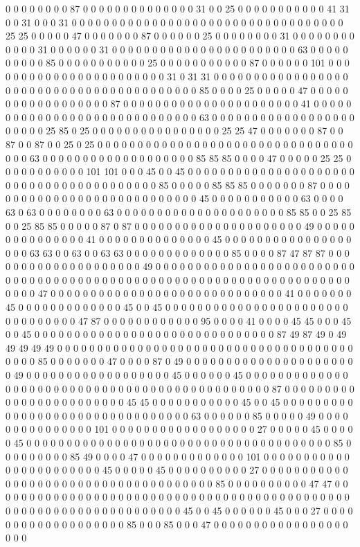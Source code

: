 0 0 0 0 0 0 0 0 87 0 0 0 0 0 0 0 0 0 0 0 0 0 0 31 0 0 25 0 0 0 0 0 0 0 0 0 0 0 41 31 0 0 31 0 0 0 31 0 0 0 0 0 0 0 0 0 0 0 0 0 0 0 0 0 0 0 0 0 0 0 0 0 0 0 0 0 0 0 0 0 0 25 25 0 0 0 0 0 47 0 0 0 0 0 0 0 87 0 0 0 0 0 0 25 0 0 0 0 0 0 0 0 31 0 0 0 0 0 0 0 0 0 0 0 0 31 0 0 0 0 0 0 31 0 0 0 0 0 0 0 0 0 0 0 0 0 0 0 0 0 0 0 0 0 0 0 63 0 0 0 0 0 0 0 0 0 0 85 0 0 0 0 0 0 0 0 0 0 0 25 0 0 0 0 0 0 0 0 0 0 0 87 0 0 0 0 0 0 101 0 0 0 0 0 0 0 0 0 0 0 0 0 0 0 0 0 0 0 0 0 0 0 31 0 31 31 0 0 0 0 0 0 0 0 0 0 0 0 0 0 0 0 0 0 0 0 0 0 0 0 0 0 0 0 0 0 0 0 0 0 0 0 0 0 0 0 0 85 0 0 0 0 25 0 0 0 0 0 47 0 0 0 0 0 0 0 0 0 0 0 0 0 0 0 0 0 0 87 0 0 0 0 0 0 0 0 0 0 0 0 0 0 0 0 0 0 0 0 0 0 41 0 0 0 0 0 0 0 0 0 0 0 0 0 0 0 0 0 0 0 0 0 0 0 0 0 0 0 0 0 63 0 0 0 0 0 0 0 0 0 0 0 0 0 0 0 0 0 0 0 0 0 0 0 25 85 0 25 0 0 0 0 0 0 0 0 0 0 0 0 0 0 0 0 25 25 47 0 0 0 0 0 0 0 87 0 0 87 0 0 87 0 0 25 0 25 0 0 0 0 0 0 0 0 0 0 0 0 0 0 0 0 0 0 0 0 0 0 0 0 0 0 0 0 0 0 0 0 0 0 0 63 0 0 0 0 0 0 0 0 0 0 0 0 0 0 0 0 0 0 0 85 85 85 0 0 0 0 47 0 0 0 0 0 25 25 0 0 0 0 0 0 0 0 0 0 0 101 101 0 0 0 45 0 0 45 0 0 0 0 0 0 0 0 0 0 0 0 0 0 0 0 0 0 0 0 0 0 0 0 0 0 0 0 0 0 0 0 0 0 0 0 0 0 0 0 85 0 0 0 0 0 85 85 85 0 0 0 0 0 0 0 87 0 0 0 0 0 0 0 0 0 0 0 0 0 0 0 0 0 0 0 0 0 0 0 0 0 0 0 0 45 0 0 0 0 0 0 0 0 0 0 0 63 0 0 0 0 63 0 63 0 0 0 0 0 0 0 0 63 0 0 0 0 0 0 0 0 0 0 0 0 0 0 0 0 0 0 0 0 0 85 85 0 0 25 85 0 0 25 85 85 0 0 0 0 0 87 0 87 0 0 0 0 0 0 0 0 0 0 0 0 0 0 0 0 0 0 0 0 0 49 0 0 0 0 0 0 0 0 0 0 0 0 0 0 0 41 0 0 0 0 0 0 0 0 0 0 0 0 0 0 45 0 0 0 0 0 0 0 0 0 0 0 0 0 0 0 0 0 0 0 63 63 0 0 63 0 0 63 63 0 0 0 0 0 0 0 0 0 0 0 0 0 85 0 0 0 0 87 47 87 87 0 0 0 0 0 0 0 0 0 0 0 0 0 0 0 0 0 0 0 0 49 0 0 0 0 0 0 0 0 0 0 0 0 0 0 0 0 0 0 0 0 0 0 0 0 0 0 0 0 0 0 0 0 0 0 0 0 0 0 0 0 0 0 0 0 0 0 0 0 0 0 0 0 0 0 0 0 0 0 0 0 0 0 0 0 0 0 0 0 0 0 0 0 47 0 0 0 0 0 0 0 0 0 0 0 0 0 0 0 0 0 0 0 0 0 0 0 0 0 0 0 0 0 41 0 0 0 0 0 0 0 45 0 0 0 0 0 0 0 0 0 0 0 0 0 45 0 0 45 0 0 0 0 0 0 0 0 0 0 0 0 0 0 0 0 0 0 0 0 0 0 0 0 0 0 0 0 0 0 0 0 47 87 0 0 0 0 0 0 0 0 0 0 0 0 95 0 0 0 0 41 0 0 0 0 45 45 0 0 0 45 0 0 45 0 0 0 0 0 0 0 0 0 0 0 0 0 0 0 0 0 0 0 0 0 0 0 0 0 0 0 0 0 0 87 49 87 49 0 49 49 49 49 49 0 0 0 0 0 0 0 0 0 0 0 0 0 0 0 0 0 0 0 0 0 0 0 0 0 0 0 0 0 0 0 0 0 0 0 0 0 0 0 0 0 85 0 0 0 0 0 0 0 47 0 0 0 0 87 0 49 0 0 0 0 0 0 0 0 0 0 0 0 0 0 0 0 0 0 0 0 0 0 49 0 0 0 0 0 0 0 0 0 0 0 0 0 0 0 0 0 0 45 0 0 0 0 0 0 45 0 0 0 0 0 0 0 0 0 0 0 0 0 0 0 0 0 0 0 0 0 0 0 0 0 0 0 0 0 0 0 0 0 0 0 0 0 0 0 0 0 0 0 0 0 0 87 0 0 0 0 0 0 0 0 0 0 0 0 0 0 0 0 0 0 0 0 0 0 0 0 45 45 0 0 0 0 0 0 0 0 0 0 0 45 0 0 45 0 0 0 0 0 0 0 0 0 0 0 0 0 0 0 0 0 0 0 0 0 0 0 0 0 0 0 0 0 0 0 0 63 0 0 0 0 0 0 85 0 0 0 0 0 49 0 0 0 0 0 0 0 0 0 0 0 0 0 0 0 101 0 0 0 0 0 0 0 0 0 0 0 0 0 0 0 0 0 0 27 0 0 0 0 0 45 0 0 0 0 0 45 0 0 0 0 0 0 0 0 0 0 0 0 0 0 0 0 0 0 0 0 0 0 0 0 0 0 0 0 0 0 0 0 0 0 0 0 0 0 85 0 0 0 0 0 0 0 0 0 85 49 0 0 0 0 47 0 0 0 0 0 0 0 0 0 0 0 0 0 101 0 0 0 0 0 0 0 0 0 0 0 0 0 0 0 0 0 0 0 0 0 0 0 45 0 0 0 0 0 45 0 0 0 0 0 0 0 0 0 0 27 0 0 0 0 0 0 0 0 0 0 0 0 0 0 0 0 0 0 0 0 0 0 0 0 0 0 0 0 0 0 0 0 0 0 0 0 0 85 0 0 0 0 0 0 0 0 0 0 47 47 0 0 0 0 0 0 0 0 0 0 0 0 0 0 0 0 0 0 0 0 0 0 0 0 0 0 0 0 0 0 0 0 0 0 0 0 0 0 0 0 0 0 0 0 0 0 0 0 0 0 0 0 0 0 0 0 0 0 0 0 0 0 0 0 0 0 0 45 0 0 45 0 0 0 0 0 0 45 0 0 0 27 0 0 0 0 0 0 0 0 0 0 0 0 0 0 0 0 0 0 0 85 0 0 0 85 0 0 0 47 0 0 0 0 0 0 0 0 0 0 0 0 0 0 0 0 0 0 0 0 